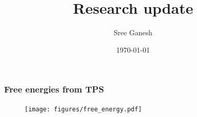 \documentclass[a4paper,8pt]{beamer}
\title[Free energy]{Research update}
\date{\today}
\author{Sree Ganesh}
\institute[U of A]{Schwartz Group \\ University of Arizona}
\begin{document}
\maketitle
%
%
%
%
\begin{frame}
\frametitle{Free energies from TPS}
\begin{figure}
\texttt{[image: figures/free\_energy.pdf]}
\end{figure}
\end{frame}
\end{document}
